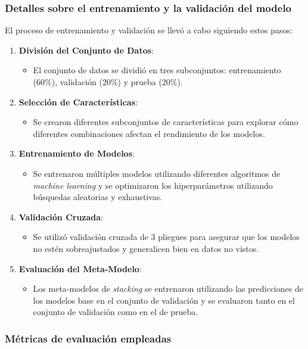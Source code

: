 \subsubsection*{Detalles sobre el entrenamiento y la validación del modelo}
El proceso de entrenamiento y validación se llevó a cabo siguiendo estos pasos:

\begin{enumerate}
    \item \textbf{División del Conjunto de Datos}: 
    \begin{itemize}
        \item El conjunto de datos se dividió en tres subconjuntos: entrenamiento (60\%), validación (20\%) y prueba (20\%).
    \end{itemize}
    \item \textbf{Selección de Características}: 
    \begin{itemize}
        \item Se crearon diferentes subconjuntos de características para explorar cómo diferentes combinaciones afectan el rendimiento de los modelos.
    \end{itemize}
    \item \textbf{Entrenamiento de Modelos}: 
    \begin{itemize}
        \item Se entrenaron múltiples modelos utilizando diferentes algoritmos de \textit{machine learning} y se optimizaron los hiperparámetros utilizando búsquedas aleatorias y exhaustivas.
    \end{itemize}
    \item \textbf{Validación Cruzada}: 
    \begin{itemize}
        \item Se utilizó validación cruzada de 3 pliegues para asegurar que los modelos no estén sobreajustados y generalicen bien en datos no vistos.
    \end{itemize}
    \item \textbf{Evaluación del Meta-Modelo}: 
    \begin{itemize}
        \item Los meta-modelos de \textit{stacking} se entrenaron utilizando las predicciones de los modelos base en el conjunto de validación y se evaluaron tanto en el conjunto de validación como en el de prueba.
    \end{itemize}
\end{enumerate}

\subsubsection*{Métricas de evaluación empleadas}

